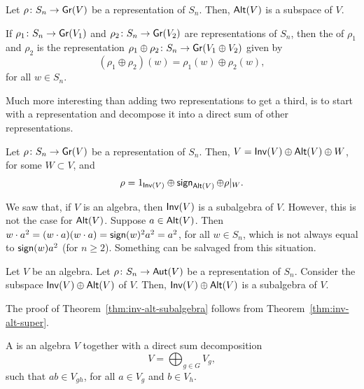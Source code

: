 \begin{proposition}
    Let \(\rho \colon S_n \to \operatorname{\mathsf{Gr}}(V)\) be a representation of \(S_n\).
    Then, \(\operatorname{\mathsf{Alt}}(V)\) is a subspace of \(V\).
\end{proposition}

\begin{definition}
    If \(\rho_1 \colon S_n \to \operatorname{\mathsf{Gr}}(V_1)\) and \(\rho_2 \colon S_n \to \operatorname{\mathsf{Gr}}(V_2)\) are representations of \(S_n\),
    then the  of \(\rho_1\) and \(\rho_2\) is the representation \(\rho_1 \oplus \rho_2 \colon S_n \to \operatorname{\mathsf{Gr}}(V_1 \oplus V_2)\) given by
    \begin{equation}
        (\rho_1 \oplus \rho_2)(w) = \rho_1(w) \oplus \rho_2(w),
    \end{equation}
    for all \(w \in S_n\).
\end{definition}

Much more interesting than adding two representations to get a third,
is to start with a representation and decompose it into a direct sum of other representations.

\begin{theorem}
    Let \(\rho \colon S_n \to \operatorname{\mathsf{Gr}}(V)\) be a representation of \(S_n\).
    Then, \(V = \operatorname{\mathsf{Inv}}(V) \oplus \operatorname{\mathsf{Alt}}(V) \oplus W\), for some \(W \subset V\),
    and 
    \begin{equation}
        \rho = 1_{\operatorname{\mathsf{Inv}}(V)} \oplus \operatorname{\mathsf{sign}}_{\operatorname{\mathsf{Alt}}(V)} \oplus \rho|_W.
    \end{equation}
\end{theorem}

We saw that, if \(V\) is an algebra, then \(\operatorname{\mathsf{Inv}}(V)\) is a subalgebra of \(V\).
However, this is not the case for \(\operatorname{\mathsf{Alt}}(V)\).
Suppose \(a \in \operatorname{\mathsf{Alt}}(V)\).
Then \(w \cdot a^2 = (w \cdot a) (w \cdot a) = \operatorname{\mathsf{sign}}(w)^2 a^2 = a^2\), for all \(w \in S_n\), which is not always equal to \(\operatorname{\mathsf{sign}}(w) a^2\) (for \(n \geq 2\)).
Something can be salvaged from this situation.

\begin{theorem} \label{thm:inv-alt-subalgebra}
    Let \(V\) be an algebra.
    Let \(\rho \colon S_n \to \operatorname{\mathsf{Aut}}(V)\) be a representation of \(S_n\).
    Consider the subspace \(\operatorname{\mathsf{Inv}}(V) \oplus \operatorname{\mathsf{Alt}}(V)\) of \(V\).
    Then, \(\operatorname{\mathsf{Inv}}(V) \oplus \operatorname{\mathsf{Alt}}(V)\) is a subalgebra of \(V\).
\end{theorem}

The proof of Theorem~\ref{thm:inv-alt-subalgebra} follows from Theorem~\ref{thm:inv-alt-super}.

\begin{definition}
    A  is an algebra \(V\) together with a direct sum decomposition
    \begin{equation}
        V = \bigoplus_{g \in G} V_g,
    \end{equation}
    such that \(ab \in V_{gh}\), for all \(a \in V_g\) and \(b \in V_h\).
\end{definition}

